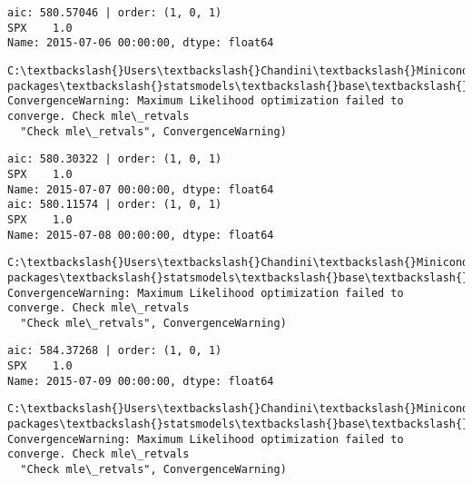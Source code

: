 \documentclass[11pt]{article}
\begin{document}
    \begin{Verbatim}[commandchars=\\\{\}]
aic: 580.57046 | order: (1, 0, 1)
SPX    1.0
Name: 2015-07-06 00:00:00, dtype: float64

    \end{Verbatim}

    \begin{Verbatim}[commandchars=\\\{\}]
C:\textbackslash{}Users\textbackslash{}Chandini\textbackslash{}Miniconda3\textbackslash{}envs\textbackslash{}auquan\textbackslash{}lib\textbackslash{}site-packages\textbackslash{}statsmodels\textbackslash{}base\textbackslash{}model.py:496: ConvergenceWarning: Maximum Likelihood optimization failed to converge. Check mle\_retvals
  "Check mle\_retvals", ConvergenceWarning)

    \end{Verbatim}

    \begin{Verbatim}[commandchars=\\\{\}]
aic: 580.30322 | order: (1, 0, 1)
SPX    1.0
Name: 2015-07-07 00:00:00, dtype: float64
aic: 580.11574 | order: (1, 0, 1)
SPX    1.0
Name: 2015-07-08 00:00:00, dtype: float64

    \end{Verbatim}

    \begin{Verbatim}[commandchars=\\\{\}]
C:\textbackslash{}Users\textbackslash{}Chandini\textbackslash{}Miniconda3\textbackslash{}envs\textbackslash{}auquan\textbackslash{}lib\textbackslash{}site-packages\textbackslash{}statsmodels\textbackslash{}base\textbackslash{}model.py:496: ConvergenceWarning: Maximum Likelihood optimization failed to converge. Check mle\_retvals
  "Check mle\_retvals", ConvergenceWarning)

    \end{Verbatim}

    \begin{Verbatim}[commandchars=\\\{\}]
aic: 584.37268 | order: (1, 0, 1)
SPX    1.0
Name: 2015-07-09 00:00:00, dtype: float64

    \end{Verbatim}

    \begin{Verbatim}[commandchars=\\\{\}]
C:\textbackslash{}Users\textbackslash{}Chandini\textbackslash{}Miniconda3\textbackslash{}envs\textbackslash{}auquan\textbackslash{}lib\textbackslash{}site-packages\textbackslash{}statsmodels\textbackslash{}base\textbackslash{}model.py:496: ConvergenceWarning: Maximum Likelihood optimization failed to converge. Check mle\_retvals
  "Check mle\_retvals", ConvergenceWarning)

    \end{Verbatim}
\end{document}
